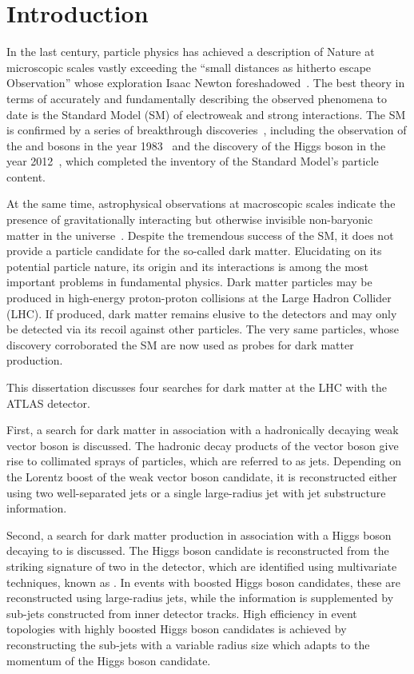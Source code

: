 %
\chapter{Introduction}
\label{sec:intro}

In the last century, particle physics has achieved a description of Nature at microscopic scales vastly exceeding the ``small distances as hitherto escape Observation'' whose exploration Isaac Newton foreshadowed~\cite{Newton1704}. The best theory in terms of accurately and fundamentally describing the observed phenomena to date is the Standard Model (SM) of electroweak and strong interactions. The SM is confirmed by a series of breakthrough discoveries~\cite{Pais1988}, including the observation of the \PW and \PZ bosons in the year 1983~\cite{Arnison1983,Banner1983,Arnison1983-2,Bagnaia1983} and the discovery of the Higgs boson in the year 2012~\cite{HIGG-2012-27,CMS-HIG-12-028}, which completed the inventory of the Standard Model's particle content.

At the same time, astrophysical observations at macroscopic scales indicate the presence of gravitationally interacting but otherwise invisible non-baryonic matter in the universe~\cite{Bertone2010}. Despite the tremendous success of the SM, it does not provide a particle candidate for the so-called dark matter. Elucidating on its potential particle nature, its origin and its interactions is among the most important problems in fundamental physics. Dark matter particles may be produced in high-energy proton-proton collisions at the Large Hadron Collider (LHC). If produced, dark matter remains elusive to the detectors and may only be detected via its recoil against other particles.  The very same particles, whose discovery corroborated the SM are now used as probes for dark matter production.

This dissertation discusses four searches for dark matter at the LHC with the ATLAS detector.

First, a search for dark matter in association with a hadronically decaying weak vector boson is discussed. The hadronic decay products of the vector boson give rise to collimated sprays of particles, which are referred to as jets. Depending on the Lorentz boost of the weak vector boson candidate, it is reconstructed either using two well-separated jets or a single large-radius jet with jet substructure information.

Second, a search for dark matter production in association with a Higgs boson decaying to \bquarks is discussed.
The Higgs boson candidate is reconstructed from the striking signature of two \bjets in the detector, which are identified using multivariate techniques, known as \btagging. In events with boosted Higgs boson candidates, these are reconstructed using large-radius jets, while the \btagging information is supplemented by sub-jets constructed from inner detector tracks. High \btagging efficiency in event topologies with highly boosted Higgs boson candidates is achieved by reconstructing the sub-jets with a variable radius size which adapts to the momentum of the Higgs boson candidate.

